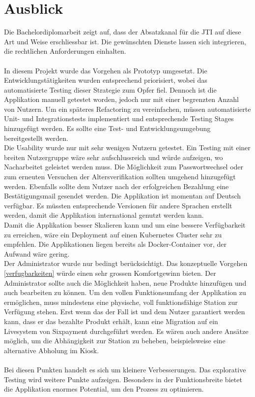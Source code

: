 \section{Ausblick}
Die Bachelordiplomarbeit zeigt auf, dass der Absatzkanal für die \ac{JTI} auf diese Art und Weise erschliessbar ist. Die gewünschten Dienste lassen sich integrieren, die rechtlichen Anforderungen einhalten.\\\\
In diesem Projekt wurde das Vorgehen als Prototyp umgesetzt. Die Entwicklungstätigkeiten wurden entsprechend priorisiert, wobei das automatisierte Testing dieser Strategie zum Opfer fiel. Dennoch ist die Applikation manuell getestet worden, jedoch nur mit einer begrenzten Anzahl von Nutzern. 
Um ein späteres Refactoring zu vereinfachen, müssen automatisierte Unit- und Integrationstests implementiert und entsprechende Testing Stages hinzugefügt werden. Es sollte eine Test- und Entwicklungsumgebung bereitgestellt werden.
\\
Die Usability wurde nur mit sehr wenigen Nutzern getestet. Ein Testing mit einer breiten Nutzergruppe wäre sehr aufschlussreich und würde aufzeigen, wo Nacharbeitet geleistet werden muss. Die Möglichkeit zum Passwortwechsel oder zum erneuten Versuchen der Altersverifikation sollten umgehend hinzugefügt werden. Ebenfalls sollte dem Nutzer nach der erfolgreichen Bezahlung eine Bestätigungsmail gesendet werden. Die Applikation ist momentan auf Deutsch verfügbar. Es müssten entsprechende Versionen für andere Sprachen erstellt werden, damit die Applikation international genutzt werden kann. \\
Damit die Applikation besser Skalieren kann und um eine bessere Verfügbarkeit zu erreichen, wäre ein Deployment auf einen Kubernetes Cluster sehr zu empfehlen. Die Applikationen liegen bereits als Docker-Container vor, der Aufwand wäre gering. \\
Der Administrator wurde nur bedingt berücksichtigt. Das konzeptuelle Vorgehen \ref{verfugbarkeiten} würde einen sehr grossen Komfortgewinn bieten. Der Administrator sollte auch die Möglichkeit haben, neue Produkte hinzufügen und auch bearbeiten zu können. 
Um den vollen Funktionsumfang der Applikation zu ermöglichen, muss mindestens eine physische, voll funktionsfähige Station zur Verfügung stehen. Erst wenn das der Fall ist und dem Nutzer garantiert werden kann, dass er das bezahlte Produkt erhält, kann eine Migration auf ein Livesystem von Sixpayment durchgeführt werden. Es wären auch andere Ansätze möglich, um die Abhängigkeit zur Station zu beheben, beispielsweise eine alternative Abholung im Kiosk. \\\\
Bei diesen Punkten handelt es sich um kleinere Verbesserungen. Das explorative Testing wird weitere Punkte aufzeigen. Besonders in der Funktionsbreite bietet die Applikation enormes Potential, um den Prozess zu optimieren. 
\newpage